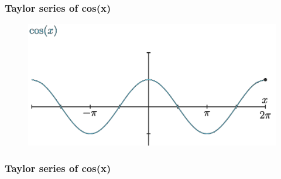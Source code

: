 \documentclass[notes]{beamer}
\begin{document}
\begin{frame}
	\frametitle{Taylor series of cos(x)}
	\begin{figure}[ht]
		\centering
		\includegraphics[width=\textwidth]{figs/cosx.png}
	\end{figure}
\end{frame}


\begin{frame}
	\frametitle{Taylor series of cos(x)}
\end{frame}
\end{document}
